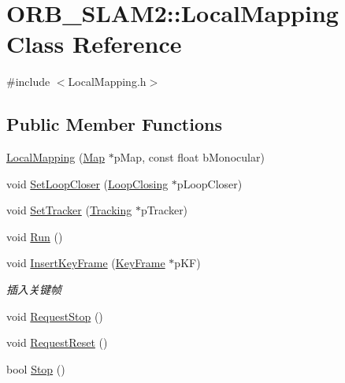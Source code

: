 \hypertarget{class_o_r_b___s_l_a_m2_1_1_local_mapping}{}\section{O\+R\+B\+\_\+\+S\+L\+A\+M2\+:\+:Local\+Mapping Class Reference}
\label{class_o_r_b___s_l_a_m2_1_1_local_mapping}


{\ttfamily \#include $<$Local\+Mapping.\+h$>$}

\subsection*{Public Member Functions}
\begin{DoxyCompactItemize}
\item 
\mbox{\hyperlink{class_o_r_b___s_l_a_m2_1_1_local_mapping_aa87b27706cc45e36cbb8c7a21c90ed23}{Local\+Mapping}} (\mbox{\hyperlink{class_o_r_b___s_l_a_m2_1_1_map}{Map}} $\ast$p\+Map, const float b\+Monocular)
\item 
void \mbox{\hyperlink{class_o_r_b___s_l_a_m2_1_1_local_mapping_af64985dda85b4f0775ef2ef7fc9b5942}{Set\+Loop\+Closer}} (\mbox{\hyperlink{class_o_r_b___s_l_a_m2_1_1_loop_closing}{Loop\+Closing}} $\ast$p\+Loop\+Closer)
\item 
void \mbox{\hyperlink{class_o_r_b___s_l_a_m2_1_1_local_mapping_a164b3d0a2a75daba006469ea8aca8a63}{Set\+Tracker}} (\mbox{\hyperlink{class_o_r_b___s_l_a_m2_1_1_tracking}{Tracking}} $\ast$p\+Tracker)
\item 
void \mbox{\hyperlink{class_o_r_b___s_l_a_m2_1_1_local_mapping_a0f9fa8a0236f55629b0f485db05deb2c}{Run}} ()
\item 
void \mbox{\hyperlink{class_o_r_b___s_l_a_m2_1_1_local_mapping_af2d70466a1a217fb7e55d874931ce688}{Insert\+Key\+Frame}} (\mbox{\hyperlink{class_o_r_b___s_l_a_m2_1_1_key_frame}{Key\+Frame}} $\ast$p\+KF)
\begin{DoxyCompactList}\small\item\em 插入关键帧 \end{DoxyCompactList}\item 
void \mbox{\hyperlink{class_o_r_b___s_l_a_m2_1_1_local_mapping_a0931d72a1f25f3e012f53f3e693e2a47}{Request\+Stop}} ()
\item 
void \mbox{\hyperlink{class_o_r_b___s_l_a_m2_1_1_local_mapping_a1e2754881977ca4d9dc7b3d0c06b4eb8}{Request\+Reset}} ()
\item 
bool \mbox{\hyperlink{class_o_r_b___s_l_a_m2_1_1_local_mapping_a6acf915f6b65bd4e2341e85a320d4930}{Stop}} ()

\end{DoxyCompactItemize}
